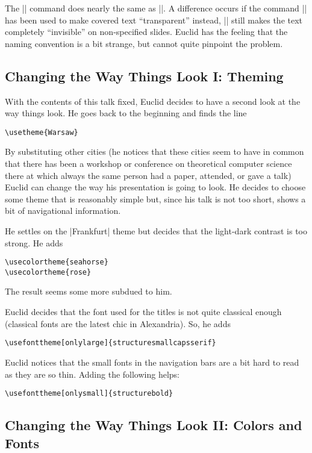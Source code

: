 The |\visible| command does nearly the same as |\uncover|. A
difference occurs if the command || has
been used to make covered text ``transparent'' instead, |\visible| still makes the text
completely ``invisible'' on non-specified slides. Euclid has
the feeling that the naming convention is a bit strange, but cannot
quite pinpoint the problem.

\subsection{Changing the Way Things Look I: Theming}

With the contents of this talk fixed, Euclid decides to have a second
look at the way things look. He goes back to the beginning and finds
the line
\begin{verbatim}
\usetheme{Warsaw}
\end{verbatim}
By substituting other cities (he notices that these cities seem to
have in common that there has been a workshop or conference on
theoretical computer science there at which always the same person had
a paper, attended, or gave a talk) Euclid can change the way his
presentation is going to look. He decides to choose some theme that is
reasonably simple but, since his talk is not too short, shows a bit of
navigational information.

He settles on the |Frankfurt| theme but decides that the light-dark
contrast is too strong. He adds
\begin{verbatim}
\usecolortheme{seahorse}
\usecolortheme{rose}
\end{verbatim}
The result seems some more subdued to him.

Euclid decides that the font used for the titles is not quite
classical enough (classical fonts are the latest chic in
Alexandria). So, he adds
\begin{verbatim}
\usefonttheme[onlylarge]{structuresmallcapsserif}
\end{verbatim}

Euclid notices that the small fonts in the navigation bars
are a bit hard to read as they are so thin. Adding the following
helps:
\begin{verbatim}
\usefonttheme[onlysmall]{structurebold}
\end{verbatim}


\subsection{Changing the Way Things Look II: Colors and Fonts}

